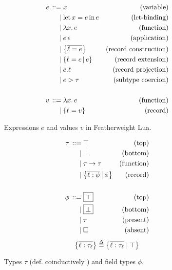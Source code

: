 \begin{subfigure}{.49\textwidth}
\begin{align*}
    \graintro e
    x 
    & \text{(variable)}
    \graitem
    \fllet{x}{e}e
    & \text{(let-binding)}
    \graitem
    \fllam{x} e
    & \text{(function)}
    \graitem
    e\,e
    & \text{(application)}        
    \graitem
    \flrec{\overline{\ell = e}}
    & \text{(record construction)}
    \graitem
    \flext{\ell = e}{e}
    & \text{(record extension)}
    \graitem
    \flproj{e}{\ell}
    & \text{(record projection)}
    \graitem
    \flcast{e}{\tau}
    & \text{(subtype coercion)}
    \\ \\
    \graintro v
    \fllam{x} e
    & \text{(function)}
    \graitem
    \flrec{\ell = v}
    & \text{(record)}
\end{align*}
\caption{Expressions $e$ and values $v$ in Featherweight Lua.}
\label{fig:featherweight-lua-expr}
\end{subfigure}
\hfill
\begin{subfigure}{.49\textwidth}
\begin{align*}
    \graintro \tau
    \top
    & \text{(top)}
    \graitem
    \bot
    & \text{(bottom)}
    \graitem
    \tau \to \tau
    & \text{(function)}
    \graitem
    \flext{\overline{\ell : \phi}}{\phi}
    & \text{(record)}
    \\ \\ 
    \graintro \phi 
    \flftop
    & \text{(top)}
    \graitem
    \flfbot 
    & \text{(bottom)}
    \graitem
    \tau
    & \text{(present)}
    \graitem
    \flabsent 
    & \text{(absent)}
\end{align*}
$$ \flrec{ \overline{\ell : \tau_\ell} } \defeq \flrec{ \overline{\ell : \tau_\ell} \mid \top } $$
\caption{Types $\tau$ (def. coinductively \cite{castagna-polymorphic-variants}) and field types $\phi$.}
\label{fig:featherweight-lua-types}
\end{subfigure}
